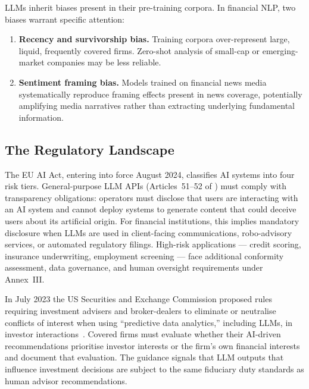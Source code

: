 \begin{deepdive}
LLMs inherit biases present in their pre-training corpora.  In financial
NLP, two biases warrant specific attention:
\begin{enumerate}
  \item \textbf{Recency and survivorship bias.}  Training corpora over-represent
        large, liquid, frequently covered firms.  Zero-shot analysis of small-cap
        or emerging-market companies may be less reliable.
  \item \textbf{Sentiment framing bias.}  Models trained on financial news
        media systematically reproduce framing effects present in news coverage,
        potentially amplifying media narratives rather than extracting
        underlying fundamental information.
\end{enumerate}

\subsection{The Regulatory Landscape}
\label{sec:llm-regulation}

\begin{remark}
\label{rem:eu-ai-act}
The EU AI Act, entering into force August 2024, classifies AI systems
into four risk tiers.  General-purpose LLM APIs (Articles~51--52 of \citet{euaiact2024}) must comply
with transparency obligations: operators must disclose that users are
interacting with an AI system and cannot deploy systems to generate content
that could deceive users about its artificial origin.  For financial
institutions, this implies mandatory disclosure when LLMs are used in
client-facing communications, robo-advisory services, or automated
regulatory filings.  High-risk applications — credit scoring, insurance
underwriting, employment screening — face additional conformity assessment,
data governance, and human oversight requirements under Annex~III.
\end{remark}

\begin{remark}
\label{rem:sec-guidance}
In July 2023 the US Securities and Exchange Commission proposed rules
requiring investment advisers and broker-dealers to eliminate or neutralise
conflicts of interest when using ``predictive data analytics,'' including
LLMs, in investor interactions~\citep{sec2023predictive}.  Covered firms must evaluate whether their
AI-driven recommendations prioritise investor interests or the firm's own
financial interests and document that evaluation.  The guidance signals
that LLM outputs that influence investment decisions are subject to the
same fiduciary duty standards as human advisor recommendations.
\end{remark}

\end{deepdive}

